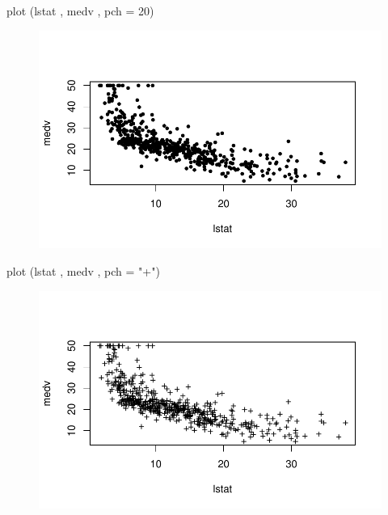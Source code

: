 \documentclass[
  letterpaper,
  DIV=11,
  numbers=noendperiod]{scrartcl}
\newenvironment{Shaded}{\begin{snugshade}}{\end{snugshade}}
\newcommand{\AttributeTok}[1]{\textcolor[rgb]{0.40,0.45,0.13}{#1}}
\newcommand{\DecValTok}[1]{\textcolor[rgb]{0.68,0.00,0.00}{#1}}
\newcommand{\FunctionTok}[1]{\textcolor[rgb]{0.28,0.35,0.67}{#1}}
\newcommand{\NormalTok}[1]{\textcolor[rgb]{0.00,0.23,0.31}{#1}}
\newcommand{\StringTok}[1]{\textcolor[rgb]{0.13,0.47,0.30}{#1}}
\begin{document}
\begin{Shaded}
\begin{Highlighting}[]
\FunctionTok{plot}\NormalTok{ (lstat , medv , }\AttributeTok{pch =} \DecValTok{20}\NormalTok{)}
\end{Highlighting}
\end{Shaded}

\begin{figure}[H]

{\centering \includegraphics{Resumen-2---3_files/figure-pdf/unnamed-chunk-9-3.pdf}

}

\end{figure}

\begin{Shaded}
\begin{Highlighting}[]
\FunctionTok{plot}\NormalTok{ (lstat , medv , }\AttributeTok{pch =} \StringTok{"+"}\NormalTok{)}
\end{Highlighting}
\end{Shaded}

\begin{figure}[H]

{\centering \includegraphics{Resumen-2---3_files/figure-pdf/unnamed-chunk-9-4.pdf}

}

\end{figure}
\end{document}

